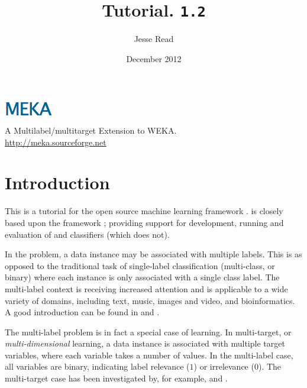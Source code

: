 \documentclass[11pt]{article}
\newcommand{\MEKA}{Meka}
\newcommand{\WEKA}{Weka}
\def\version{{\tt 1.2}}
\begin{document}
\title{Tutorial. \framework{\MEKA} \version }

\author{Jesse Read}

\date{December 2012}

\maketitle

\begin{center}
	\includegraphics{MEKA.png}\\
		A Multilabel/multitarget Extension to WEKA.\\
		\url{http://meka.sourceforge.net}
\end{center}

\tableofcontents

\pagestyle{empty}
\pagebreak

\section{Introduction}

This is a tutorial for the open source machine learning framework \framework{\MEKA}. \framework{\MEKA} is closely based upon the \framework{\WEKA} framework \cite{WEKA}; providing support for development, running and evaluation of  and  classifiers (which  does not).

In the  problem, a data instance may be associated with multiple labels. This is as opposed to the traditional task of single-label classification (\ie multi-class, or binary) where each instance is only associated with a single class label. The multi-label context is receiving increased attention and is applicable to a wide variety of domains, including text, music, images and video, and bioinformatics. A good introduction can be found in \cite{MMD} and \cite{Thesis}.

The multi-label problem is in fact a special case of  learning. In multi-target, or \textit{multi-dimensional} learning, a data instance is associated with multiple target variables, where each variable takes a number of values. In the multi-label case, all variables are binary, indicating label relevance ($1$) or irrelevance ($0$). The multi-target case has been investigated by, for example, \cite{UPM} and \cite{MT}.  
\end{document}
